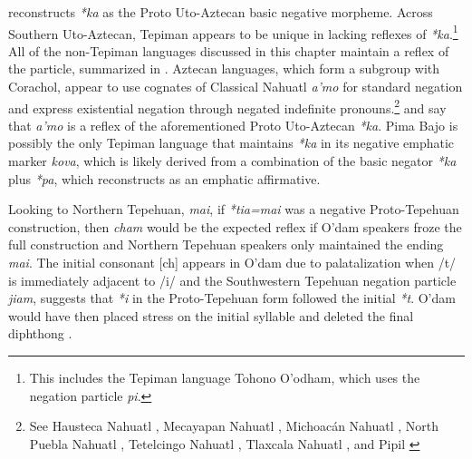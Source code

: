 \documentclass[output=paper]{langsci/langscibook}
\begin{document}
 \citet[32-3]{langacker1977} reconstructs \emph{*ka} as the Proto Uto-Aztecan basic negative morpheme. Across Southern Uto-Aztecan, Tepiman appears to be unique in lacking reflexes of \emph{*ka}.\footnote{This includes the Tepiman language Tohono O'odham, which uses the negation particle \emph{pi}.} All of the non-Tepiman languages discussed in this chapter maintain a reflex of the particle, summarized in . Aztecan languages, which form a subgroup with Corachol, appear to use cognates of Classical Nahuatl \emph{a'mo} \citep{launey1981} for standard negation and express existential negation through negated indefinite pronouns.\footnote{See Hausteca Nahuatl \citep{bellerb1979}, Mecayapan Nahuatl \citep{wolgemuth2002}, Michoacán Nahuatl \citep{sischo1979}, North Puebla Nahuatl \citep{brockway1979}, Tetelcingo Nahuatl \citep{tuggy1979}, Tlaxcala Nahuatl \citep{flores2019}, and Pipil \citep{campbell1985}} \citet{hill2014} and \citet{langacker1977} say that \emph{a'mo} is a reflex of the aforementioned Proto Uto-Aztecan \emph{*ka}. Pima Bajo is possibly the only Tepiman language that maintains \emph{*ka} in its negative emphatic marker \emph{kova}, which is likely derived from a combination of the basic negator \emph{*ka} plus \emph{*pa}, which \citet[32]{langacker1977} reconstructs as an emphatic affirmative.

Looking to Northern Tepehuan, \emph{mai}, if \emph{*tia=mai} was a negative Proto-Tepehuan construction, then \emph{cham} would be the expected reflex if O’dam speakers froze the full construction and Northern Tepehuan speakers only maintained the ending \emph{mai}. The initial consonant [ch] appears in O’dam due to palatalization when /t/ is immediately adjacent to /i/ and the Southwestern Tepehuan negation particle \emph{jiam}, suggests that \emph{*i} in the Proto-Tepehuan form followed the initial \emph{*t}. O’dam would have then placed stress on the initial syllable and deleted the final diphthong \citep{willett1982}. 
\end{document}
